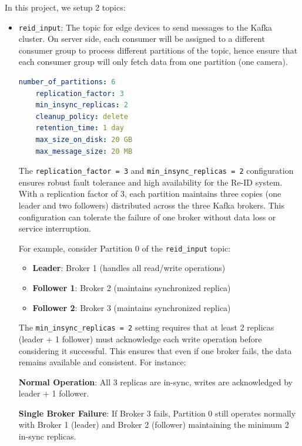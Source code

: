 In this project, we setup 2 topics:
\begin{itemize}
    \item \texttt{reid\_input}: The topic for edge devices to send messages to the Kafka cluster. On server side, each consumer will be assigned to a different consumer group to process different partitions of the topic, hence ensure that each consumer group will only fetch data from one partition (one camera). 
    
    \begin{lstlisting}[language=yaml, caption={Topic settings for \texttt{reid\_input}}]
    number_of_partitions: 6
    replication_factor: 3
    min_insync_replicas: 2
    cleanup_policy: delete
    retention_time: 1 day
    max_size_on_disk: 20 GB
    max_message_size: 20 MB
    \end{lstlisting}

    The \texttt{replication\_factor = 3} and \texttt{min\_insync\_replicas = 2} configuration ensures robust fault tolerance and high availability for the Re-ID system. With a replication factor of 3, each partition maintains three copies (one leader and two followers) distributed across the three Kafka brokers. This configuration can tolerate the failure of one broker without data loss or service interruption.
    
    For example, consider Partition 0 of the \texttt{reid\_input} topic:
    \begin{itemize}
        \item \textbf{Leader}: Broker 1 (handles all read/write operations)
        \item \textbf{Follower 1}: Broker 2 (maintains synchronized replica)
        \item \textbf{Follower 2}: Broker 3 (maintains synchronized replica)
    \end{itemize}
    
    The \texttt{min\_insync\_replicas = 2} setting requires that at least 2 replicas (leader + 1 follower) must acknowledge each write operation before considering it successful. This ensures that even if one broker fails, the data remains available and consistent. For instance:
    
    \textbf{Normal Operation}: All 3 replicas are in-sync, writes are acknowledged by leader + 1 follower.
    
    \textbf{Single Broker Failure}: If Broker 3 fails, Partition 0 still operates normally with Broker 1 (leader) and Broker 2 (follower) maintaining the minimum 2 in-sync replicas.
    

\end{itemize}
